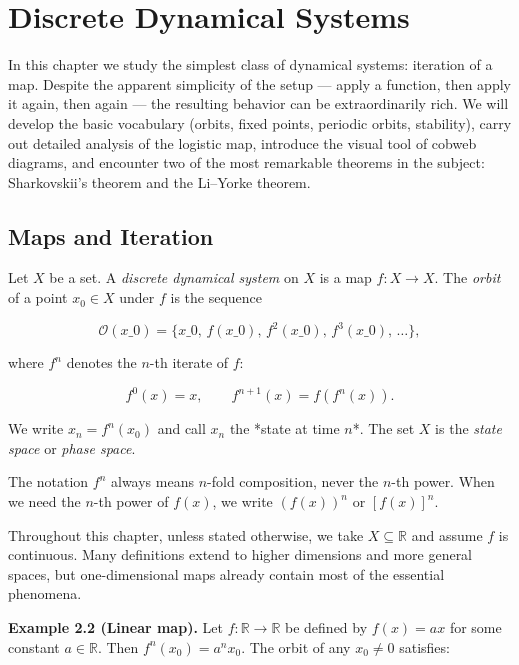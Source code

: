 \chapter{Discrete Dynamical Systems}\label{ch:2}

In this chapter we study the simplest class of dynamical systems: iteration of a map. Despite the apparent simplicity of the setup --- apply a function, then apply it again, then again --- the resulting behavior can be extraordinarily rich. We will develop the basic vocabulary (orbits, fixed points, periodic orbits, stability), carry out detailed analysis of the logistic map, introduce the visual tool of cobweb diagrams, and encounter two of the most remarkable theorems in the subject: Sharkovskii's theorem and the Li--Yorke theorem.

\section{Maps and Iteration}\label{sec:2.1}

\begin{definition}\label{def:2.1.}
Let $X$ be a set. A \textit{discrete dynamical system} on $X$ is a map $f: X \to X$. The \textit{orbit} of a point $x_0 \in X$ under $f$ is the sequence

\[
\mathcal{O}(x\_0) = \{x\_0, \, f(x\_0), \, f^2(x\_0), \, f^3(x\_0), \, \ldots\},
\]

where $f^n$ denotes the $n$-th iterate of $f$:

\[
f^0(x) = x, \qquad f^{n+1}(x) = f(f^n(x)).
\]

We write $x_n = f^n(x_0)$ and call $x_n$ the *state at time $n$*. The set $X$ is the \textit{state space} or \textit{phase space}.
\end{definition}


\begin{remark}
The notation $f^n$ always means $n$-fold composition, never the $n$-th power. When we need the $n$-th power of $f(x)$, we write $(f(x))^n$ or $[f(x)]^n$.

Throughout this chapter, unless stated otherwise, we take $X \subseteq \mathbb{R}$ and assume $f$ is continuous. Many definitions extend to higher dimensions and more general spaces, but one-dimensional maps already contain most of the essential phenomena.
\end{remark}


\textbf{Example 2.2 (Linear map).} Let $f: \mathbb{R} \to \mathbb{R}$ be defined by $f(x) = ax$ for some constant $a \in \mathbb{R}$. Then $f^n(x_0) = a^n x_0$. The orbit of any $x_0 \neq 0$ satisfies:

